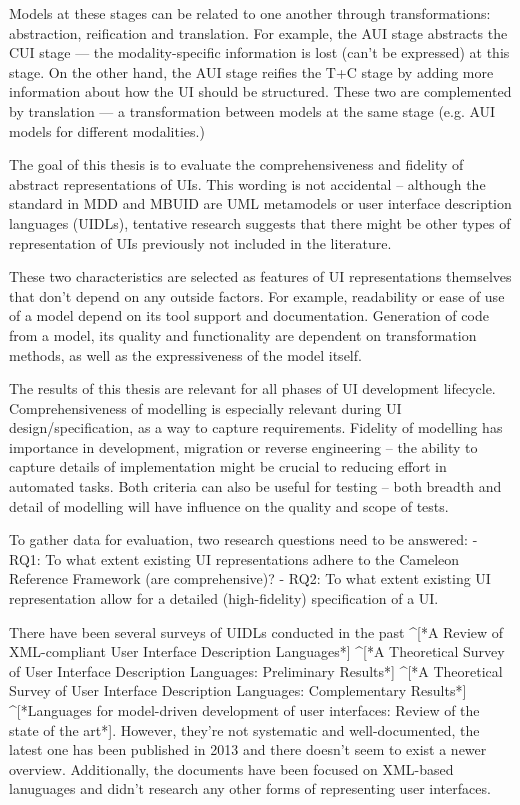 Models at these stages can be related to one another through transformations: abstraction, reification and translation.
For example, the AUI stage abstracts the CUI stage — the modality-specific information is lost (can’t be expressed) at this stage.
On the other hand, the AUI stage reifies the T+C stage by adding more information about how the UI should be structured.
These two are complemented by translation — a transformation between models at the same stage (e.g. AUI models for different modalities.)

The goal of this thesis is to evaluate the comprehensiveness and fidelity of abstract representations of UIs.
This wording is not accidental – although the standard in MDD and MBUID are UML metamodels or user interface description languages (UIDLs), tentative research suggests that there might be other types of representation of UIs previously not included in the literature.

These two characteristics are selected as features of UI representations themselves that don’t depend on any outside factors.
For example, readability or ease of use of a model depend on its tool support and documentation.
Generation of code from a model, its quality and functionality are dependent on transformation methods, as well as the expressiveness of the model itself.

The results of this thesis are relevant for all phases of UI development lifecycle.
Comprehensiveness of modelling is especially relevant during UI design/specification, as a way to capture requirements.
Fidelity of modelling has importance in development, migration or reverse engineering – the ability to capture details of implementation might be crucial to reducing effort in automated tasks.
Both criteria can also be useful for testing – both breadth and detail of modelling will have influence on the quality and scope of tests.

To gather data for evaluation, two research questions need to be answered:
- RQ1: To what extent existing UI representations adhere to the Cameleon Reference Framework (are comprehensive)?
- RQ2: To what extent existing UI representation allow for a detailed (high-fidelity) specification of a UI.

There have been several surveys of UIDLs conducted in the past ^[*A Review of XML-compliant User Interface Description Languages*] ^[*A Theoretical Survey of User Interface Description Languages: Preliminary Results*] ^[*A Theoretical Survey of User Interface Description Languages: Complementary Results*] ^[*Languages for model-driven development of user interfaces: Review of the state of the art*].
However, they’re not systematic and well-documented, the latest one has been published in 2013 and there doesn’t seem to exist a newer overview.
Additionally, the documents have been focused on XML-based lanuguages and didn’t research any other forms of representing user interfaces.

